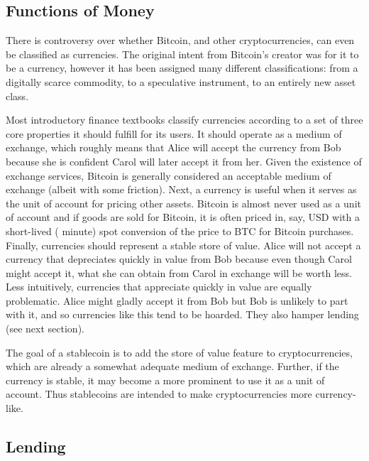 \subsection{Functions of Money}

There is controversy over whether Bitcoin, and other cryptocurrencies, can even be classified as currencies. The original intent from Bitcoin's creator was for it to be a currency, however it has been assigned many different classifications: from a digitally scarce commodity, to a speculative instrument, to an entirely new asset class.

Most introductory finance textbooks classify currencies according to a set of three core properties it should fulfill for its users. It should operate as a medium of exchange, which roughly means that Alice will accept the currency from Bob because she is confident Carol will later accept it from her. Given the existence of exchange services, Bitcoin is generally considered an acceptable medium of exchange (albeit with some friction). Next, a currency is useful when it serves as the unit of account for pricing other assets. Bitcoin is almost never used as a unit of account and if goods are sold for Bitcoin, it is often priced in, say, USD with a short-lived ( minute) spot conversion of the price to BTC for Bitcoin purchases. Finally, currencies should represent a stable store of value. Alice will not accept a currency that depreciates quickly in value from Bob because even though Carol might accept it, what she can obtain from Carol in exchange will be worth less. Less intuitively, currencies that appreciate quickly in value are equally problematic. Alice might gladly accept it from Bob but Bob is unlikely to part with it, and so currencies like this tend to be hoarded. They also hamper lending (see next section).

The goal of a stablecoin is to add the store of value feature to cryptocurrencies, which are already a somewhat adequate medium of exchange. Further, if the currency is stable, it may become a more prominent to use it as a unit of account. Thus stablecoins are intended to make cryptocurrencies more currency-like.~\cite{rogoff2017curse}


\subsection{Lending}

